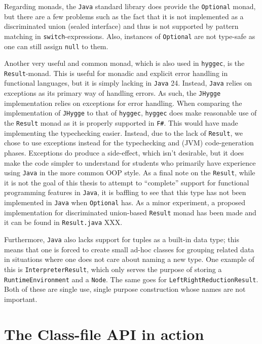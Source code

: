 Regarding monads, the \texttt{Java} standard library does provide the \texttt{Optional} monad, but there are a few problems such as the
fact that it is not implemented as a discriminated union (sealed interface) and thus is not supported by pattern matching in
\texttt{switch}-expressions. Also, instances of \texttt{Optional} are not type-safe as one can still assign \texttt{null} to them.

Another very useful and common monad, which is also used in \texttt{hyggec}, is the \texttt{Result}-monad. This is useful for monadic
and explicit error handling in functional languages, but it is simply lacking in \texttt{Java} 24. Instead, \texttt{Java} relies on
exceptions as its primary way of handling errors. As such, the \texttt{JHygge} implementation relies on exceptions for error handling.
When comparing the implementation of \texttt{JHygge} to that of \texttt{hyggec}, \texttt{hyggec} does make reasonable use of the \texttt{Result}
monad as it is properly supported in \texttt{F\#}. This would have made implementing the typechecking easier. Instead, due to the lack
of \texttt{Result}, we chose to use exceptions instead for the typechecking and (JVM) code-generation phases. Exceptions do produce a
side-effect, which isn't desirable, but it does make the code simpler to understand for students who primarily have experience using
\texttt{Java} in the more common OOP style. As a final note on the \texttt{Result}, while it is not the goal of this thesis to attempt
to ``complete'' support for functional programming features in \texttt{Java}, it is baffling to see that this type has not been implemented
in \texttt{Java} when \texttt{Optional} has. As a minor experiment, a proposed implementation for discriminated union-based \texttt{Result}
monad has been made and it can be found in \texttt{Result.java} XXX.

Furthermore, \texttt{Java} also lacks support for tuples as a built-in data type; this means that one is forced to create small ad-hoc
classes for grouping related data in situations where one does not care about naming a new type. One example of this is \texttt{InterpreterResult},
which only serves the purpose of storing a \texttt{RuntimeEnvironment} and a \texttt{Node}. The same goes for \texttt{LeftRightReductionResult}.
Both of these are single use, single purpose construction whose names are not important.

\section{The Class-file API in action}

